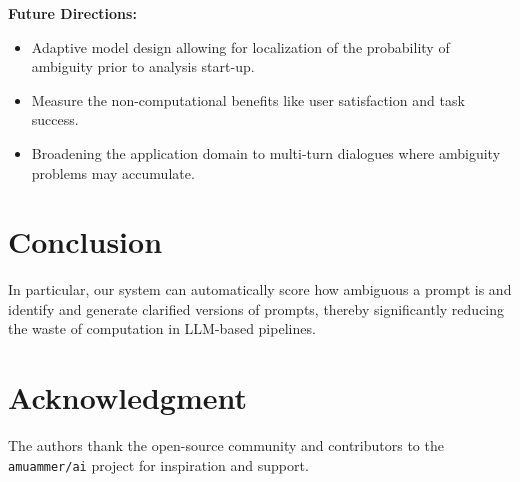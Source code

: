\documentclass[11pt,a4paper]{article}
\begin{document}
\textbf{Future Directions:}
\begin{itemize}
    \item Adaptive model design allowing for localization of the probability of ambiguity prior to analysis start-up.
    \item Measure the non-computational benefits like user satisfaction and task success.
    \item Broadening the application domain to multi-turn dialogues where ambiguity problems may accumulate.
\end{itemize}

\section{Conclusion}

In particular, our system can automatically score how ambiguous a prompt is and identify and generate clarified versions of prompts, thereby significantly reducing the waste of computation in LLM-based pipelines.

\section*{Acknowledgment}
The authors thank the open-source community and contributors to the \texttt{amuammer/ai} project for inspiration and support.


%
%



\end{document}
